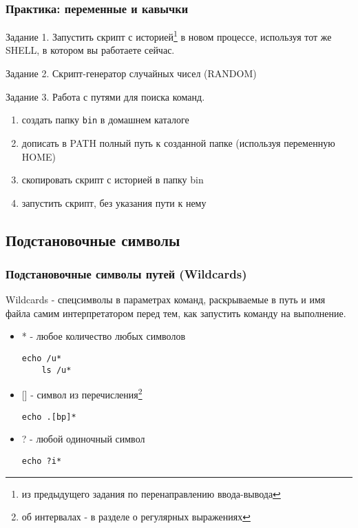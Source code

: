 \begin{frame}[fragile]
  \frametitle{Практика: переменные и кавычки}
  
  \normalsize{ }
  \alert{Задание 1.}
  Запустить скрипт с историей\footnote{из предыдущего задания по перенаправлению ввода-вывода} в новом процессе, используя тот же SHELL, в котором вы работаете сейчас.  \pause

  \alert{Задание 2.}
  Скрипт-генератор случайных чисел (RANDOM) \pause

  \alert{Задание 3.} Работа с путями для поиска команд.
    \begin{enumerate}
      \item создать папку \verb+bin+ в домашнем каталоге
      \item дописать в PATH полный путь к созданной папке (используя переменную HOME)
      \item скопировать скрипт с историей в папку bin
      \item запустить скрипт, без указания пути к нему 
    \end{enumerate}

\end{frame}

\subsection{Подстановочные символы}

\begin{frame}[fragile]
  \frametitle{Подстановочные символы путей (Wildcards)}

  \alert{Wildcards} - спецсимволы в параметрах команд, раскрываемые в путь и имя файла самим интерпретатором перед тем, как запустить команду на выполнение. \pause


  \begin{itemize}
    \item \alert{*} - любое количество любых символов
\begin{lstlisting}[basicstyle=\normalsize]
	echo /u*
	ls /u*
\end{lstlisting} \pause
    \item \alert{[]} - символ из перечисления\footnote{об интервалах - в разделе о регулярных выражениях}
\begin{lstlisting}[basicstyle=\normalsize]
	echo .[bp]*
\end{lstlisting} \pause
    \item \alert{?} - любой одиночный символ
\begin{lstlisting}[basicstyle=\normalsize]
	echo ?i*
\end{lstlisting} 
  \end{itemize}

\end{frame}

